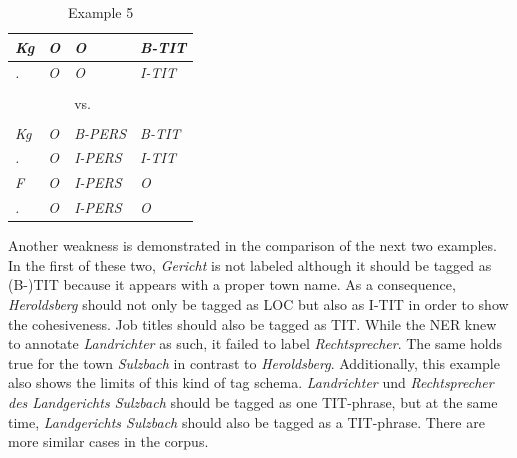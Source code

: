 \documentclass[11pt,a4paper]{article}
\begin{document}
\begin{table}
	\centering
	\begin{tabular}{l l l l}
		\textit{Kg} & \textit{O} & \textit{\textcolor{customGreen}{O}} & \textit{\textcolor{customGreen}{B-TIT}}\\ \hline
		\textit{.} & \textit{O} & \textit{\textcolor{customGreen}{O}} & \textit{\textcolor{customGreen}{I-TIT}}\\ \hline
		\\
		&&vs. \\
		\\ \hline
		\textit{Kg} & \textit{O} & \textit{\textcolor{customGreen}{B-PERS}} & \textit{\textcolor{customGreen}{B-TIT}}\\ \hline
		\textit{.} & \textit{O} & \textit{\textcolor{customGreen}{I-PERS}} & \textit{\textcolor{customGreen}{I-TIT}}\\ \hline
		
		\textit{F} & \textit{O} & \textit{\textcolor{customGreen}{I-PERS}} & \textit{O}\\ \hline
		\textit{.} & \textit{O} & \textit{\textcolor{customGreen}{I-PERS}} & \textit{O}\\ \hline
	\end{tabular}
	\caption{Example 5}
	\label{tab:example5}
\end{table}

Another weakness is demonstrated in the comparison of the next two examples. In the first of these two, \textit{Gericht} is not labeled although it should be tagged as (B-)TIT because it appears with a proper town name. As a consequence, \textit{Heroldsberg} should not only be tagged as LOC but also as I-TIT in order to show the cohesiveness. Job titles should also be tagged as TIT. While the NER knew to annotate \textit{Landrichter} as such, it failed to label \textit{Rechtsprecher}. The same holds true for the town \textit{Sulzbach} in contrast to \textit{Heroldsberg}. Additionally, this example also shows the limits of this kind of tag schema. \textit{Landrichter} und \textit{Rechtsprecher des Landgerichts Sulzbach} should be tagged as one TIT-phrase, but at the same time, \textit{Landgerichts Sulzbach} should also be tagged as a TIT-phrase. There are more similar cases in the corpus.
\end{document}

